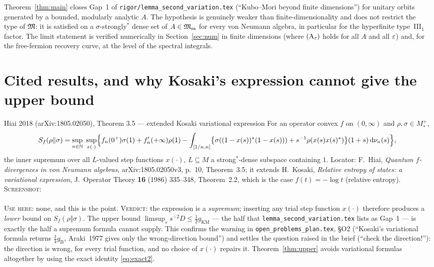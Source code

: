 \documentclass[11pt]{article}
\newcommand{\Msa}{\cM_{\mathrm{sa}}}\newcommand{\Mpsa}{\cM'_{\mathrm{sa}}}
\newcommand{\gKM}{g_{\mathrm{KM}}}\newcommand{\gB}{g_{\mathrm B}}
\begin{document}
\begin{verdictok}
Theorem~\ref{thm:main} closes Gap~1 of \texttt{rigor/lemma\_second\_variation.tex}
(``Kubo--Mori beyond finite dimensions'') for unitary orbits generated by a bounded, modularly analytic
$A$.  The hypothesis is genuinely weaker than finite-dimensionality and does not restrict the type of
$\mathfrak M$: it is satisfied on a $\sigma$-strongly$^*$ dense set of $A\in\Msa$ for every von Neumann algebra,
in particular for the hyperfinite type~III$_1$ factor.  The limit statement is verified numerically in
Section~\ref{sec:num} in finite dimensions (where $(\mathrm A_\varepsilon)$ holds for all $A$ and all $\varepsilon$) and,
for the free-fermion recovery curve, at the level of the spectral integrals.
\end{verdictok}

\section{Cited results, and why Kosaki's expression cannot give the upper bound}\label{sec:kosaki}

\begin{citedbox}{Hiai 2018 (arXiv:1805.02050), Theorem 3.5 --- extended Kosaki variational expression}
For an operator convex $f$ on $(0,\infty)$ and $\rho,\sigma\in M^+_*$,
\[
 S_f(\rho\Vert\sigma)=\sup_{n\in\mathbb N}\ \sup_{x(\cdot)}
 \Bigl\{f_n(0^+)\sigma(1)+f_n'(+\infty)\rho(1)
 -\int_{[1/n,n]}\bigl\{\sigma((1-x(s))^*(1-x(s)))+s^{-1}\rho(x(s)x(s)^*)\bigr\}(1+s)\dd\nu_n(s)\Bigr\},
\]
the inner supremum over all $L$-valued step functions $x(\cdot)$, $L\subseteq M$ a strong$^*$-dense subspace
containing $1$.  Locator: F.~Hiai, \emph{Quantum $f$-divergences in von Neumann algebras},
arXiv:1805.02050v3, p.~10, Theorem~3.5; it extends H.~Kosaki, \emph{Relative entropy of states: a
variational expression}, J.~Operator Theory \textbf{16} (1986) 335--348, Theorem~2.2, which is the case
$f(t)=-\log t$ (relative entropy).  \textsc{Screenshot:}\\
\\
\textsc{Use here:} none, and this is the point.  \textsc{Verdict:} the expression is a \emph{supremum};
inserting any trial step function $x(\cdot)$ therefore produces a \emph{lower} bound on
$S_f(\rho\Vert\sigma)$.  The upper bound $\limsup_ss^{-2}D\le\frac12\gKM$ --- the half that
\texttt{lemma\_second\_variation.tex} lists as Gap~1 --- is exactly the half a supremum formula cannot
supply.  This confirms the warning in \texttt{open\_problems\_plan.tex}, \S O2 (``Kosaki's variational
formula returns $\frac14\gB$, Araki~1977 gives only the wrong-direction bound'') and settles the question
raised in the brief (``check the direction!''): the direction is wrong, for every trial function, and no
choice of $x(\cdot)$ repairs it.  Theorem~\ref{thm:upper} avoids variational formulas altogether by using
the exact identity \eqref{eq:exact2}.
\end{citedbox}
\end{document}
